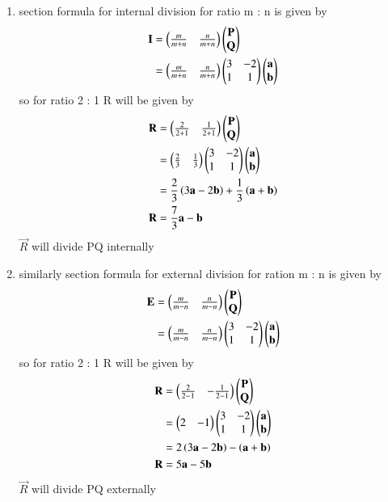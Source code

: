 \documentclass[journal,12pt,twocolumn]{IEEEtran}
\begin{document}
\begin{enumerate}
\item 
section formula for internal division for ratio m : n is given by 
\begin{align}
\mathbf{I} &= \begin{pmatrix}\frac{m}{m+n} & \frac{n}{m+n}\end{pmatrix}\begin{pmatrix}\mathbf{P}\\\mathbf{Q}\end{pmatrix}\\
&= \begin{pmatrix}\frac{m}{m+n} & \frac{n}{m+n}\end{pmatrix}\begin{pmatrix}3 & -2\\1 & 1\end{pmatrix}\begin{pmatrix}\mathbf{a} \\ \mathbf{b}\end{pmatrix}
\end{align}
so for ratio 2 : 1 R will be given by
\begin{align}
\mathbf{R} &= \begin{pmatrix}\frac{2}{2+1} & \frac{1}{2+1}\end{pmatrix}\begin{pmatrix}\mathbf{P}\\\mathbf{Q}\end{pmatrix}\\
&= \begin{pmatrix}\frac{2}{3}&\frac{1}{3}\end{pmatrix}\begin{pmatrix}3 & -2\\1 & 1\end{pmatrix}\begin{pmatrix}\mathbf{a} \\ \mathbf{b}\end{pmatrix}\\
&= \frac{2}{3}\left(3\mathbf{a} - 2\mathbf{b}\right) + \frac{1}{3}\left(\mathbf{a} +\mathbf{b}\right)\\
\mathbf{R} &= \frac{7}{3}\mathbf{a} - \mathbf{b}
\end{align}
$\vec{R}$ will divide PQ internally\\
\item similarly section formula for external division for ration m : n is given by
\begin{align}
\mathbf{E} &= \begin{pmatrix}\frac{m}{m-n} & \frac{n}{m-n}\end{pmatrix}\begin{pmatrix}\mathbf{P}\\\mathbf{Q}\end{pmatrix}\\
&= \begin{pmatrix}\frac{m}{m-n} & \frac{n}{m-n}\end{pmatrix}\begin{pmatrix}3 & -2\\1 & 1\end{pmatrix}\begin{pmatrix}\mathbf{a} \\ \mathbf{b}\end{pmatrix}
\end{align}
so for ratio 2 : 1 R will be given by
\begin{align}
\mathbf{R} &= \begin{pmatrix}\frac{2}{2-1} & -\frac{1}{2-1}\end{pmatrix}\begin{pmatrix}\mathbf{P}\\\mathbf{Q}\end{pmatrix}\\
&= \begin{pmatrix}2 & -1\end{pmatrix}\begin{pmatrix}3 & -2\\1 & 1\end{pmatrix}\begin{pmatrix}\mathbf{a} \\ \mathbf{b}\end{pmatrix}\\
&= 2\left(3\mathbf{a} - 2\mathbf{b}\right) - \left(\mathbf{a} +\mathbf{b}\right)\\
\mathbf{R} &= 5\mathbf{a} - 5\mathbf{b}
\end{align}
$\vec{R}$ will divide PQ externally
\end{enumerate}
\end{document}
